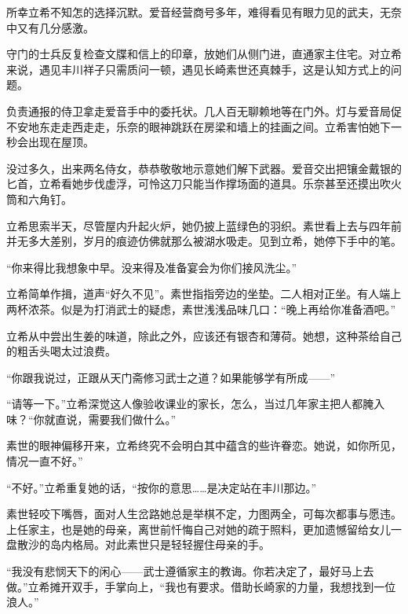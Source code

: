 \documentclass{article}
\begin{document}
所幸立希不知怎的选择沉默。爱音经营商号多年，难得看见有眼力见的武夫，无奈中又有几分感激。



守门的士兵反复检查文牒和信上的印章，放她们从侧门进，直通家主住宅。对立希来说，遇见丰川祥子只需质问一顿，遇见长崎素世还真棘手，这是认知方式上的问题。



负责通报的侍卫拿走爱音手中的委托状。几人百无聊赖地等在门外。灯与爱音局促不安地东走走西走走，乐奈的眼神跳跃在房梁和墙上的挂画之间。立希害怕她下一秒会出现在屋顶。



没过多久，出来两名侍女，恭恭敬敬地示意她们解下武器。爱音交出把镶金戴银的匕首，立希看她步伐虚浮，可怜这刀只能当作撑场面的道具。乐奈甚至还摸出吹火筒和六角钉。



立希思索半天，尽管屋内升起火炉，她仍披上蓝绿色的羽织。素世看上去与四年前并无多大差别，岁月的痕迹仿佛就那么被湖水吸走。见到立希，她停下手中的笔。



“你来得比我想象中早。没来得及准备宴会为你们接风洗尘。”



立希简单作揖，道声“好久不见”。素世指指旁边的坐垫。二人相对正坐。有人端上两杯浓茶。似是为打消武士的疑虑，素世浅浅品味几口：“晚上再给你准备酒吧。”



立希从中尝出生姜的味道，除此之外，应该还有银杏和薄荷。她想，这种茶给自己的粗舌头喝太过浪费。



“你跟我说过，正跟从天门斋修习武士之道？如果能够学有所成——”



“请等一下。”立希深觉这人像验收课业的家长，怎么，当过几年家主把人都腌入味？“你就直说，需要我们做什么。”



素世的眼神偏移开来，立希终究不会明白其中蕴含的些许眷恋。她说，如你所见，情况一直不好。”



“不好。”立希重复她的话，“按你的意思……是决定站在丰川那边。”



素世轻咬下嘴唇，面对人生岔路她总是举棋不定，力图两全，可每次都事与愿违。上任家主，也是她的母亲，离世前忏悔自己对她的疏于照料，更加遗憾留给女儿一盘散沙的岛内格局。对此素世只是轻轻握住母亲的手。



“我没有悲悯天下的闲心——武士遵循家主的教诲。你若决定了，最好马上去做。”立希摊开双手，手掌向上，“我也有要求。借助长崎家的力量，我想找到一位浪人。”
\end{document}
